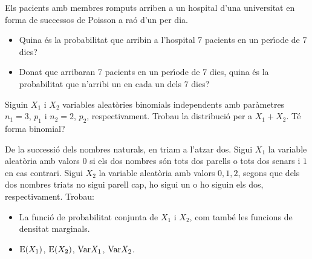 \begin{prob}
{Els pacients amb membres romputs arriben a un hospital d'una
universitat en forma de successos de Poisson a ra\'o d'un per dia.
\begin{itemize}
\item[a)] {Quina \'es la probabilitat que arribin a l'hospital 7 pacients en
un per\'{\i}ode de 7 dies?}
\item[b)] {Donat que arribaran 7 pacients en un per\'{\i}ode de 7 dies, quina \'es la
probabilitat que n'arribi un en cada un dels 7 dies?}
\end{itemize}
}
\end{prob}

\begin{prob}
{Siguin $X_1$ i $X_2$ variables aleat\`ories binomials independents amb
par\`ametres $n_1=3$, $p_1$ i $n_2=2$, $p_2$, respectivament. Trobau la
distribuci\'o per a $X_1 +X_2$. T\'e forma binomial?}
\end{prob}

\begin{prob}
{De la successi\'o dels nombres naturals, en triam a l'atzar dos.
Sigui $X_1$ la variable aleat\`oria amb valors $0$ si els dos nombres s\'on tots
dos parells o tots dos senars i $1$ en cas contrari. Sigui $X_2$ la variable
aleat\`oria amb valors $0,1,2$, segons que dels dos nombres triats 
no sigui parell cap, ho sigui un o ho siguin els dos, respectivament. Trobau:
\begin{itemize}
\item[a)] {La funci\'o de probabilitat conjunta de $X_1$ i $X_2$, com tamb\'e
les funcions
de densitat marginals.}
\item[b)] {${\rm E} (X_1)$, ${\rm E} (X_2)$, ${\rm Var} X_1$, ${\rm Var} X_2$.}
\end{itemize}
}
\end{prob}

